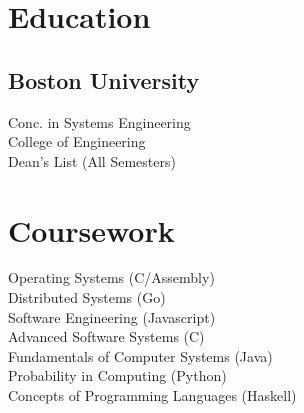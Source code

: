 \documentclass[letterpaper]{deedy-resume} %
\begin{document}
  \begin{minipage}[t]{0.33\textwidth} %






    \section{Education} 

    \subsection{Boston University}

    Conc. in Systems Engineering \\
    College of Engineering \\
    Dean's List (All Semesters) \\

    \sectionspace %


    \section{Coursework}

    Operating Systems (C/Assembly) \\
    Distributed Systems (Go) \\
    Software Engineering (Javascript) \\
    Advanced Software Systems (C) \\
    Fundamentals of Computer Systems (Java) \\
    Probability in Computing (Python) \\
    Concepts of Programming Languages (Haskell)
    \sectionspace %


\end{minipage}
\end{document}
